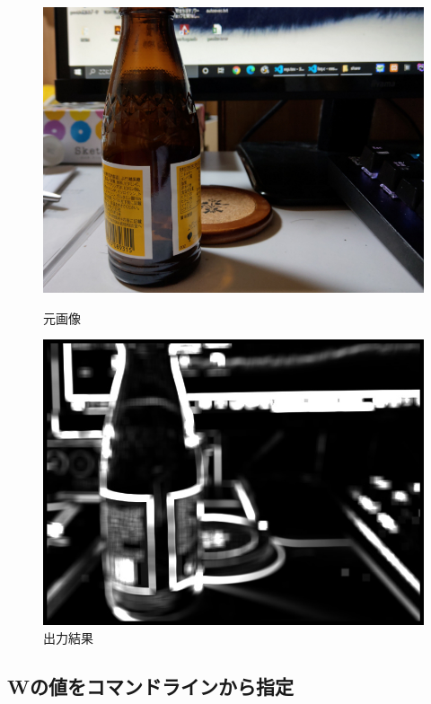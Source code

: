 \documentclass[11pt]{jarticle}
\begin{document}
\begin{figure}[h]
    \begin{minipage}{0.5\hsize}
        \centering
        \includegraphics[scale=.3]{4-3.jpg}
        \caption{元画像}
        \label{4-3.jpg}
    \end{minipage}
    \begin{minipage}{0.5\hsize}
        \centering
        \includegraphics[scale=.3]{4-4.jpg}
        \caption{出力結果}
        \label{4-4.jpg}
    \end{minipage}
\end{figure}

\subsection{Wの値をコマンドラインから指定}
\end{document}
